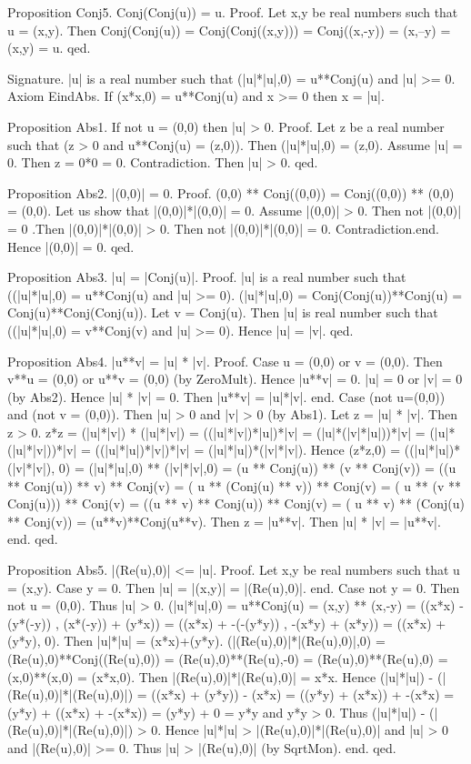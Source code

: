 \documentclass{article}
\newenvironment{forthel}{\begin{leftbar}}{\end{leftbar}}
\begin{document}
\begin{forthel}
Proposition Conj5. Conj(Conj(u)) = u.
Proof. 	Let x,y be real numbers such that u = (x,y).
Then Conj(Conj(u)) = Conj(Conj((x,y))) = Conj((x,-y)) = (x,--y) = (x,y) = u. qed.


Signature. |u| is a real number such that (|u|*|u|,0) = u**Conj(u) and |u| >= 0. 
Axiom  EindAbs. If (x*x,0) = u**Conj(u) and x >= 0 then x = |u|.



Proposition Abs1. If not u = (0,0) then |u| > 0.
Proof.  Let z be a real number such that (z > 0 and u**Conj(u) = (z,0)). Then (|u|*|u|,0) = (z,0).
Assume |u| = 0. Then z = 0*0 = 0. Contradiction. 
Then |u| > 0.
qed.

Proposition Abs2. |(0,0)| = 0.
Proof. 	(0,0) ** Conj((0,0)) = Conj((0,0)) ** (0,0) = (0,0). 
Let us show that |(0,0)|*|(0,0)| = 0.
Assume |(0,0)| > 0. Then not |(0,0)| = 0 .Then |(0,0)|*|(0,0)| > 0. Then not |(0,0)|*|(0,0)| = 0. Contradiction.end. 
Hence |(0,0)| = 0.
qed.

Proposition Abs3. |u| = |Conj(u)|.
Proof. 	|u| is a real number such that ((|u|*|u|,0) = u**Conj(u) and |u| >= 0). 
(|u|*|u|,0) = Conj(Conj(u))**Conj(u) = Conj(u)**Conj(Conj(u)).
Let v = Conj(u). Then |u| is real number such that ((|u|*|u|,0) = v**Conj(v) and |u| >= 0). 
Hence |u| = |v|.
qed.

Proposition Abs4. |u**v| = |u| * |v|.
Proof. 	Case u = (0,0) or v = (0,0). Then v**u = (0,0) or u**v = (0,0) (by ZeroMult). Hence |u**v| = 0.
|u| = 0 or |v| = 0 (by Abs2). Hence |u| * |v| = 0.
Then  |u**v| = |u|*|v|. end.
Case (not u=(0,0)) and (not v = (0,0)). Then |u| > 0 and |v| > 0 (by Abs1). Let z = |u| * |v|. Then z > 0.
z*z = (|u|*|v|) * (|u|*|v|) = ((|u|*|v|)*|u|)*|v| = (|u|*(|v|*|u|))*|v|
= (|u|*(|u|*|v|))*|v| = ((|u|*|u|)*|v|)*|v| = (|u|*|u|)*(|v|*|v|).
Hence (z*z,0)	= ((|u|*|u|)*(|v|*|v|), 0) = (|u|*|u|,0) ** (|v|*|v|,0)
= (u  **  Conj(u)) ** (v   ** Conj(v)) 
= ((u **  Conj(u)) **  v)  ** Conj(v) 
= ( u ** (Conj(u)  **  v)) ** Conj(v) 
= ( u ** (v  **  Conj(u))) ** Conj(v) 
= ((u **  v) **  Conj(u))  ** Conj(v) 
= ( u **  v) **  (Conj(u)   ** Conj(v)) = (u**v)**Conj(u**v).
Then z = |u**v|. Then |u| * |v| = |u**v|. end.
qed.

Proposition Abs5. |(Re(u),0)| <= |u|.
Proof. 	Let x,y be real numbers such that u = (x,y). 
Case y = 0. Then |u| = |(x,y)| = |(Re(u),0)|. end.
Case not y = 0. Then not u = (0,0). Thus |u| > 0.
(|u|*|u|,0) = u**Conj(u) = (x,y) ** (x,-y) = ((x*x) - (y*(-y)) , (x*(-y)) + (y*x)) = ((x*x) + -(-(y*y)) , -(x*y) + (x*y)) 
= ((x*x) + (y*y), 0). Then |u|*|u| = (x*x)+(y*y).
(|(Re(u),0)|*|(Re(u),0)|,0) = (Re(u),0)**Conj((Re(u),0)) = (Re(u),0)**(Re(u),-0) = (Re(u),0)**(Re(u),0) = (x,0)**(x,0) = (x*x,0).
Then |(Re(u),0)|*|(Re(u),0)| = x*x.
Hence (|u|*|u|) -  (|(Re(u),0)|*|(Re(u),0)|) = ((x*x) + (y*y)) - (x*x) = ((y*y) + (x*x)) + -(x*x) = (y*y) + ((x*x) + -(x*x)) = (y*y) + 0 = y*y and y*y > 0.
Thus (|u|*|u|) -  (|(Re(u),0)|*|(Re(u),0)|) > 0.
Hence |u|*|u| > |(Re(u),0)|*|(Re(u),0)| and |u| > 0 and |(Re(u),0)| >= 0.
Thus  |u| > |(Re(u),0)| (by SqrtMon).
end.
qed.


\end{forthel}
\end{document}
